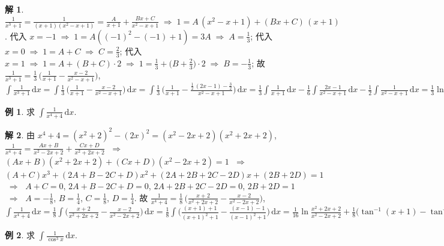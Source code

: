 \documentclass[12pt]{extarticle}
\newcommand{\ds}{\displaystyle}
\newcommand{\ie}{\;\Longrightarrow\;}
\theoremstyle{definition}
\newtheorem*{ex}{例}
\newtheorem*{sol}{解}
\begin{document}
\begin{sol}
  $\ds\frac{1}{x^3 + 1} = \frac{1}{(x + 1)(x^2 - x + 1)} = \frac{A}{x + 1} + \frac{B x + C}{x^2 - x + 1} \ie 1 = A\,(x^2 - x + 1) + (B x + C)\,(x + 1)$. 代入 $\ds x = -1\ie 1 = A((-1)^2 - (-1) + 1) = 3A \ie A = \frac{1}{3}$; 代入 $\ds x = 0\ie 1 = A + C \ie C = \frac{2}{3}$;  代入 $\ds x = 1\ie 1 = A + (B + C)\cdot 2 \ie 1 = \frac{1}{3} + \Big(B + \frac{2}{3}\Big)\cdot 2 \ie B = -\frac{1}{3}$; 故 $\ds\frac{1}{x^3 + 1} = \frac{1}{3}\,\bigg(\frac{1}{x + 1} - \frac{x - 2}{x^2 - x + 1}\bigg)$, $\ds\int\!\frac{1}{x^3 + 1}\,\text{d}x = \int\!\frac{1}{3}\,\bigg(\frac{1}{x + 1} - \frac{x - 2}{x^2 - x + 1}\bigg)\,\text{d}x = \int\!\frac{1}{3}\,\bigg(\frac{1}{x + 1} - \frac{\frac{1}{2}\,(2x - 1) - \frac{3}{2}}{x^2 - x + 1}\bigg)\,\text{d}x = \frac{1}{3}\int\!\frac{1}{x + 1}\,\text{d}x - \frac{1}{6}\int\!\frac{2x - 1}{x^2 - x + 1}\,\text{d}x - \frac{1}{2}\int\!\frac{1}{x^2 - x + 1}\,\text{d}x = \frac{1}{3}\ln|x + 1| - \frac{1}{6}\ln(x^2 - x + 1) - \frac{1}{\sqrt{3}}\tan^{-1}\frac{2x - 1}{\sqrt{3}}$
\end{sol}

\begin{ex}
  求 $\ds\int\!\frac{1}{x^4 + 4}\,\text{d}x$.
\end{ex}

\begin{sol}
  由 $x^4 + 4 = (x^2 + 2)^2 - (2x)^2 = (x^2 - 2x + 2)(x^2 + 2x + 2)$, $\ds\frac{1}{x^4 + 4} = \frac{A x + B}{x^2 - 2x + 2} + \frac{C x + D}{x^2 + 2x + 2}$ $\ie$ $(A x + B)(x^2 + 2x + 2) + (Cx + D)(x^2 - 2x + 2) = 1$ $\ie$ $(A + C)x^3 + (2A + B - 2C + D)x^2 + (2A + 2B + 2C - 2D)x + (2B + 2D) = 1$ $\ie$ $A + C = 0$, $2A + B - 2C + D = 0$, $2A + 2B + 2C - 2D = 0$, $2B + 2D = 1$ $\ie$ $\ds A = -\frac{1}{8}$, $\ds B = \frac{1}{4}$, $\ds C = \frac{1}{8}$, $\ds D = \frac{1}{4}$. 故 $\ds\frac{1}{x^4 + 4} = \frac{1}{8}\,\bigg(\frac{x + 2}{x^2 + 2x + 2} - \frac{x - 2}{x^2 - 2x + 2}\bigg)$, $\ds\int\!\frac{1}{x^4 + 4}\,\text{d}x = \frac{1}{8}\int\!\bigg(\frac{x + 2}{x^2 + 2x + 2} - \frac{x - 2}{x^2 - 2x + 2}\bigg)\,\text{d}x = \frac{1}{8}\int\!\bigg(\frac{(x + 1) + 1}{(x + 1)^2 + 1} - \frac{(x - 1) - 1}{(x - 1)^2 + 1}\bigg)\,\text{d}x = \frac{1}{16}\ln\frac{x^2 + 2x + 2}{x^2 - 2x + 2} + \frac{1}{8}\big(\tan^{-1}(x + 1) - \tan^{-1}(x - 1)\big)$
\end{sol}

\begin{ex}
  求 $\ds\int\!\frac{1}{\cos^3 x}\,\text{d}x$. 
\end{ex}
\end{document}
